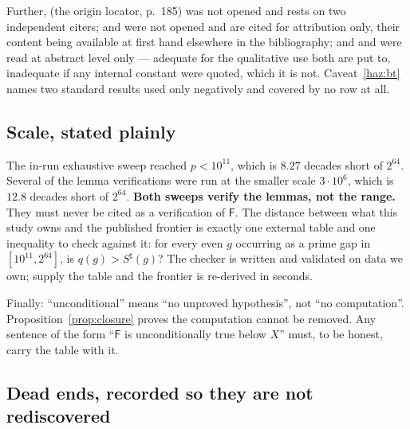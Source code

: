 \documentclass[11pt,a4paper]{article}
\theoremstyle{plain}
\theoremstyle{definition}
\theoremstyle{remark}
\newcommand{\Fb}{\mathsf{F}}
\begin{document}
Further, \cite{ribenboim2004little} (the origin locator, p.~185) was not opened and rests on
two independent citers; \cite{shanks1964maximal} and \cite{farhadian2017new} were not opened
and are cited for attribution only, their content being available at first hand elsewhere in
the bibliography; and \cite{baker2001difference} and \cite{ford2016large} were read at
abstract level only --- adequate for the qualitative use both are put to, inadequate if any
internal constant were quoted, which it is not. Caveat~\ref{haz:bt} names two standard results
used only negatively and covered by no row at all.

\subsection{Scale, stated plainly}

The in-run exhaustive sweep reached $p < 10^{11}$, which is $8.27$ decades short of $2^{64}$.
Several of the lemma verifications were run at the smaller scale $3\cdot10^6$, which is
$12.8$ decades short of $2^{64}$. \textbf{Both sweeps verify the lemmas, not the range.}
They must never be cited as a verification of $\Fb$. The distance between what this study owns
and the published frontier is exactly one external table and one inequality to check
against it: for every even $g$ occurring as a prime gap in $[10^{11}, 2^{64}]$, is
$q(g) > S^\sharp(g)$? The checker is written and validated on data we own; supply the table
and the frontier is re-derived in seconds.

Finally: ``unconditional'' means ``no unproved hypothesis'', not ``no computation''.
Proposition~\ref{prop:closure} proves the computation cannot be removed. Any sentence of the
form ``$\Fb$ is unconditionally true below $X$'' must, to be honest, carry the table with it.

\subsection{Dead ends, recorded so they are not rediscovered}
\end{document}
